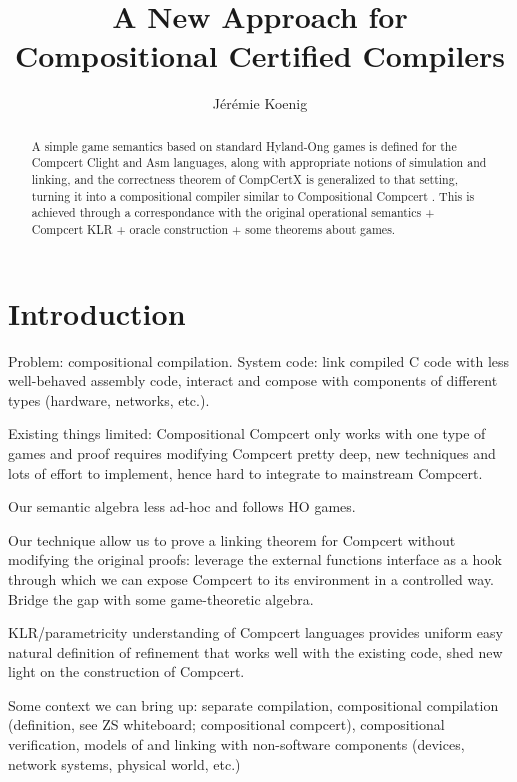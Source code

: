 \documentclass[acmsmall,anonymous]{acmart}
\begin{document}
\title{A New Approach for Compositional Certified Compilers}

\author{J\'er\'emie Koenig}

\begin{abstract}
A simple game semantics based on standard Hyland-Ong games
is defined for the Compcert Clight and Asm languages,
along with appropriate notions of simulation and linking,
and the correctness theorem of CompCertX \citep{popl15}
is generalized to that setting,
turning it into a compositional compiler
similar to Compositional Compcert \citep{compcomp}.
This is achieved through
a correspondance with the original operational semantics +
Compcert KLR +
oracle construction +
some theorems about games.
\end{abstract}

\maketitle

\section{Introduction} %

Problem:
compositional compilation.
System code:
link compiled C code with less well-behaved assembly code,
interact and compose with components of different types
(hardware, networks, etc.).

Existing things limited:
Compositional Compcert only works with one type of games
and proof requires modifying Compcert pretty deep,
new techniques and lots of effort to implement,
hence hard to integrate to mainstream Compcert.

Our semantic algebra less ad-hoc and follows HO games.

Our technique allow us to prove a linking theorem for Compcert
without modifying the original proofs:
leverage the external functions interface as a hook
through which we can expose Compcert to its environment in a controlled way.
Bridge the gap with some game-theoretic algebra.

KLR/parametricity understanding of Compcert languages provides
uniform easy natural definition of refinement
that works well with the existing code,
shed new light on the construction of Compcert.

Some context we can bring up:
separate compilation,
compositional compilation (definition, see ZS whiteboard; compositional compcert),
compositional verification,
models of and linking with non-software components
(devices, network systems, physical world, etc.)
\end{document}
